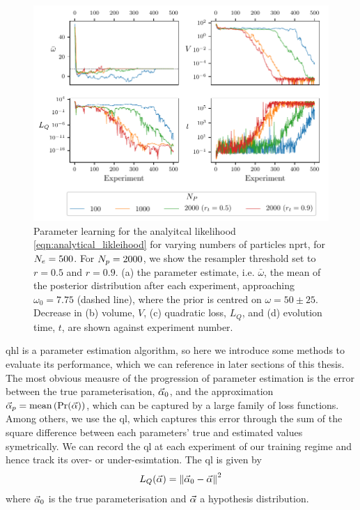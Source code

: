 \begin{figure}[t]
    \centering
    \includegraphics{algorithms/figures/params.pdf}
    \caption[Parameter learning varying number of particles]{
        Parameter learning for the analyitcal \gls{likelihood} \cref{eqn:analytical_likleihood}
        for varying numbers of \glspl{particle} \gls{nprt}, for $N_e=500$. 
        For $N_p=2000$, we show the resampler threshold set to $r=0.5$ and $r=0.9$. 
        (a) the parameter estimate, i.e. $\bar{\omega}$, the mean of the posterior distribution after each experiment, 
        approaching $\omega_0=7.75$ (dashed line), where the prior is centred on $\omega=50 \pm 25$. 
        Decrease in (b) volume, $V$, (c) quadratic loss, $L_Q$, 
        and (d) evolution time, $t$, are shown against experiment number.
        \figtableref
    }
    \label{fig:param_learning_vary_particles}
\end{figure}


\gls{qhl} is a parameter estimation algorithm, so here we introduce some methods to evaluate its performance, 
    which we can reference in later sections of this thesis. 
The most obvious meausre of the progression of parameter estimation is the error between the true parameterisation, 
    $\vec{\alpha}_0$, and the approximation $\vec{\alpha}_p = \textrm{mean} \left( \Pr(\vec{\alpha}) \right)$,
    which can be captured by a large family of loss functions. 
Among others, we use the \gls{ql}, which captures this error through the sum of the square difference between 
    each parameters' true and estimated values symetrically.
We can record the \gls{ql} at each experiment of our training regime and hence track its over- or under-esimtation. 
The \gls{ql} is given by 
    \begin{equation}
        \label{eqn:quadratic_loss}
        L_{Q}(\vec{\alpha}) = \left\| \vec{\alpha}_0 - \vec{\alpha} \right\|^2
    \end{equation}
    where $\vec{\alpha}_0$ is the true parameterisation and $\vec{\alpha}$ a hypothesis distribution.
\par 

